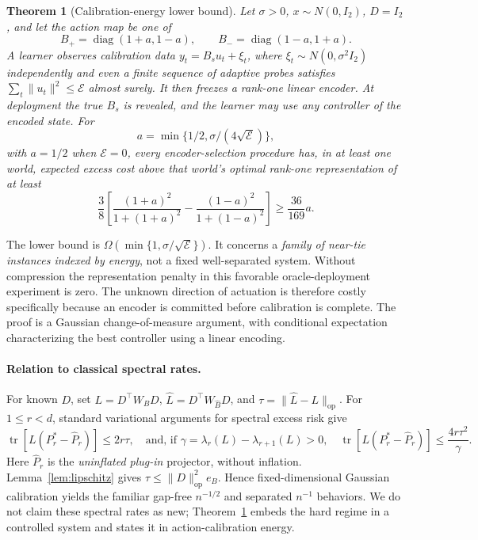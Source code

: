 \documentclass{article}
\newtheorem{theorem}{Theorem}
\newcommand{\tr}{\operatorname{tr}}
\newcommand{\op}{\mathrm{op}}
\begin{document}
\begin{theorem}[Calibration-energy lower bound]\label{thm:lower}
Let $\sigma>0$, $x\sim N(0,I_2)$, $D=I_2$, and let the action map be one of
\[
 B_+=\operatorname{diag}(1+a,1-a),\qquad
 B_-=\operatorname{diag}(1-a,1+a).
\]
A learner observes calibration data $y_t=B_su_t+\xi_t$, where $\xi_t\sim N(0,\sigma^2 I_2)$ independently and even a finite sequence of adaptive probes satisfies $\sum_t\|u_t\|^2\le\mathcal E$ almost surely. It then freezes a rank-one linear encoder. At deployment the true $B_s$ is revealed, and the learner may use any controller of the encoded state. For
\[
 a=\min\{1/2,\sigma/(4\sqrt{\mathcal E})\},
\]
with $a=1/2$ when $\mathcal E=0$, every encoder-selection procedure has, in at least one world, expected excess cost above that world's optimal rank-one representation of at least
\begin{equation}\label{eq:lower}
 \frac38\left[\frac{(1+a)^2}{1+(1+a)^2}
             -\frac{(1-a)^2}{1+(1-a)^2}\right]
 \ge\frac{36}{169}a.
\end{equation}
\end{theorem}
The lower bound is $\Omega(\min\{1,\sigma/\sqrt{\mathcal E}\})$. It concerns a \emph{family of near-tie instances indexed by energy}, not a fixed well-separated system. Without compression the representation penalty in this favorable oracle-deployment experiment is zero. The unknown direction of actuation is therefore costly specifically because an encoder is committed before calibration is complete. The proof is a Gaussian change-of-measure argument, with conditional expectation characterizing the best controller using a linear encoding.

\paragraph{Relation to classical spectral rates.}
For known $D$, set $L=D^\top W_BD$, $\widehat L=D^\top W_{\widehat B}D$, and $\tau=\|\widehat L-L\|_\op$. For $1\le r<d$, standard variational arguments for spectral excess risk \citep{reiss2020} give
\begin{equation}\label{eq:pca}
 \tr[L(P_r^*-\widehat P_r)]\le2r\tau,
 \quad\text{and, if }\gamma=\lambda_r(L)-\lambda_{r+1}(L)>0,
 \quad\tr[L(P_r^*-\widehat P_r)]\le\frac{4r\tau^2}{\gamma}.
\end{equation}
Here $\widehat P_r$ is the \emph{uninflated plug-in} projector, without inflation. Lemma~\ref{lem:lipschitz} gives $\tau\le\|D\|_\op^2 e_B$. Hence fixed-dimensional Gaussian calibration yields the familiar gap-free $n^{-1/2}$ and separated $n^{-1}$ behaviors. We do not claim these spectral rates as new; Theorem~\ref{thm:lower} embeds the hard regime in a controlled system and states it in action-calibration energy.
\end{document}
